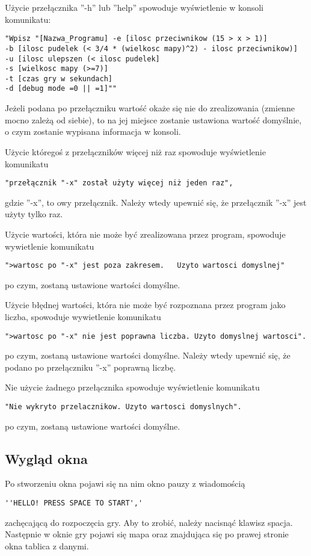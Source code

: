 \documentclass[12pt,a4paper]{article}
\begin{document}
\vspace{5mm} %
Użycie przełącznika ''-h'' lub ''help'' spowoduje wyświetlenie w konsoli komunikatu: 
\begin{verbatim}
"Wpisz "[Nazwa_Programu] -e [ilosc przeciwnikow (15 > x > 1)] 
-b [ilosc pudelek (< 3/4 * (wielkosc mapy)^2) - ilosc przeciwnikow)]
-u [ilosc ulepszen (< ilosc pudelek]
-s [wielkosc mapy (>=7)]
-t [czas gry w sekundach] 
-d [debug mode =0 || =1]""
\end{verbatim}
Jeżeli podana po przełączniku wartość okaże się nie do zrealizowania (zmienne mocno zależą od siebie), to na jej miejsce zostanie ustawiona wartość domyślnie, o czym zostanie wypisana informacja w konsoli.

Użycie któregoś z przełączników więcej niż raz spowoduje wyświetlenie komunikatu 
\begin{verbatim}
"przełącznik "-x" został użyty więcej niż jeden raz",
\end{verbatim}
gdzie ''-x'', to owy przełącznik.
Należy wtedy upewnić się, że przełącznik ''-x'' jest użyty tylko raz.

\vspace{5mm} %
Użycie wartości, która nie może być zrealizowana przez program, spowoduje wywietlenie komunikatu 
\begin{verbatim}
">wartosc po "-x" jest poza zakresem.	Uzyto wartosci domyslnej"
\end{verbatim}
po czym, zostaną ustawione wartości domyślne.

\vspace{5mm} %
Użycie błędnej wartości, która nie może być rozpoznana przez program jako liczba, spowoduje wywietlenie komunikatu 
\begin{verbatim}
">wartosc po "-x" nie jest poprawna liczba.	Uzyto domyslnej wartosci".
\end{verbatim}
po czym, zostaną ustawione wartości domyślne. Należy wtedy upewnić się, że podano po przełączniku ''-x'' poprawną liczbę.

\vspace{5mm} %
Nie użycie żadnego przełącznika spowoduje wyświetlenie komunikatu 
\begin{verbatim}
"Nie wykryto przelacznikow. Uzyto wartosci domyslnych".
\end{verbatim}
po czym, zostaną ustawione wartości domyślne.
\newpage
\subsection{Wygląd okna}
Po stworzeniu okna pojawi się na nim okno pauzy z wiadomością 
\begin{verbatim}
''HELLO! PRESS SPACE TO START','
\end{verbatim} 
zachęcającą do rozpoczęcia gry. Aby to zrobić, należy nacisnąć klawisz spacja. Następnie w oknie gry pojawi się mapa oraz znajdująca się po prawej stronie okna tablica z danymi. 
\end{document}

